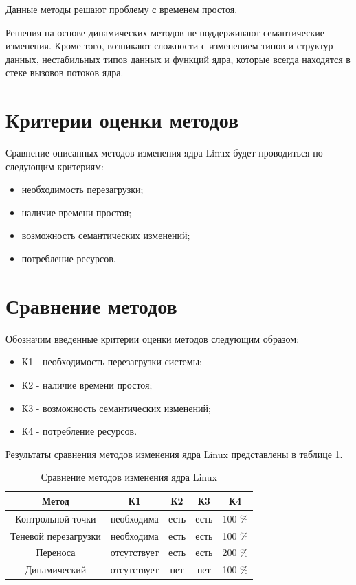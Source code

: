 Данные методы решают проблему с временем простоя.

Решения на основе динамических методов не поддерживают семантические изменения. Кроме того, возникают сложности с изменением типов и структур данных, нестабильных типов данных и функций ядра, которые всегда находятся в стеке вызовов потоков ядра.

\section{Критерии оценки методов}

Сравнение описанных методов изменения ядра Linux будет проводиться по следующим критериям:

\begin{itemize}
	\item необходимость перезагрузки;
	\item наличие времени простоя;
	\item возможность семантических изменений;
	\item потребление ресурсов.
\end{itemize}

\section{Сравнение методов}

Обозначим введенные критерии оценки методов следующим образом:

\begin{itemize}
	\item К1 - необходимость перезагрузки системы;
	\item К2 - наличие времени простоя;
	\item К3 - возможность семантических изменений;
	\item К4 - потребление ресурсов.
\end{itemize}

Результаты сравнения методов изменения ядра Linux представлены в таблице \ref{tab:comparison}.

\begin{table}[h]
    \caption{Сравнение методов изменения ядра Linux}
    \begin{center}
        \begin{tabular}{|c|c|c|c|c|}
            \hline
            Метод & К1 & К2 & К3 & К4 \\ \hline
            Контрольной точки & необходима & есть & есть & 100 \% \\ \hline
            Теневой перезагрузки & необходима & есть & есть & 100 \% \\ \hline
            Переноса & отсутствует & есть & есть & 200 \% \\ \hline
            Динамический & отсутствует & нет & нет & 100 \% \\ \hline
        \end{tabular}
    \end{center}
    \label{tab:comparison}
\end{table}

